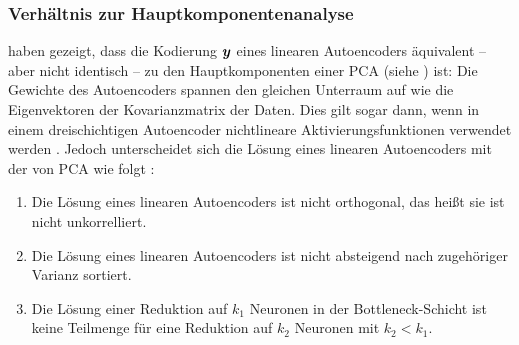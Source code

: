 \subsubsection{Verhältnis zur Hauptkomponentenanalyse}
\label{ch:MethodenDerDimRed:ML:AE:VerhaeltnisPCA}

\textcites{Baldi.1989}{Bourlard.1988} haben gezeigt, dass die Kodierung $\bm{y}$ eines linearen Autoencoders äquivalent -- aber nicht identisch -- zu den Hauptkomponenten einer PCA (siehe ) ist: Die Gewichte des Autoencoders spannen den gleichen Unterraum auf wie die Eigenvektoren der Kovarianzmatrix der Daten. Dies gilt sogar dann, wenn in einem dreischichtigen Autoencoder nichtlineare Aktivierungsfunktionen verwendet werden \parencite[291, 293]{Bourlard.1988}. Jedoch unterscheidet sich die Lösung eines linearen Autoencoders
mit der von PCA wie folgt \parencite[3]{Plaut.2018}:
\begin{enumerate}
	\item Die Lösung eines linearen Autoencoders ist nicht orthogonal, das heißt sie ist nicht unkorrelliert.
	\item Die Lösung eines linearen Autoencoders ist nicht absteigend nach zugehöriger Varianz sortiert.
	\item Die Lösung einer Reduktion auf $k_1$ Neuronen in der Bottleneck-Schicht ist keine Teilmenge für
	      eine Reduktion auf $k_2$ Neuronen mit $k_2 < k_1$.
\end{enumerate}
